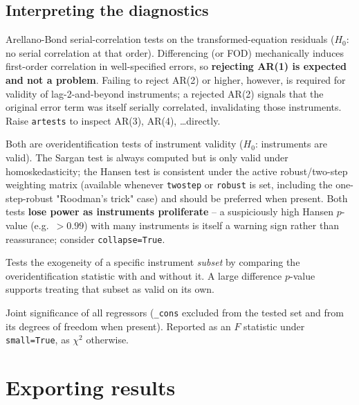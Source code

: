 \documentclass[11pt,a4paper]{article}
\begin{document}
\subsection{Interpreting the diagnostics}
\label{sec:diagdiag}

\begin{description}[nosep]
  \item[AR(1)/AR(2)] Arellano-Bond serial-correlation tests on the
    transformed-equation residuals ($H_0$: no serial correlation at that
    order). Differencing (or FOD) mechanically induces first-order
    correlation in well-specified errors, so \textbf{rejecting AR(1) is
    expected and not a problem}. Failing to reject AR(2) or higher, however,
    is required for validity of lag-2-and-beyond instruments; a rejected
    AR(2) signals that the original error term was itself serially
    correlated, invalidating those instruments. Raise \texttt{artests} to
    inspect AR(3), AR(4), \dots directly.
  \item[Sargan vs.\ Hansen] Both are overidentification tests of instrument
    validity ($H_0$: instruments are valid). The Sargan test is always
    computed but is only valid under homoskedasticity; the Hansen test is
    consistent under the active robust/two-step weighting matrix (available
    whenever \texttt{twostep} or \texttt{robust} is set, including the
    one-step-robust "Roodman's trick" case) and should be preferred when
    present. Both tests \textbf{lose power as instruments proliferate}
    \citep{Roodman2009b} -- a suspiciously high Hansen $p$-value (e.g.\
    $>0.99$) with many instruments is itself a warning sign rather than
    reassurance; consider \texttt{collapse=True}.
  \item[Difference-in-Sargan/Hansen] Tests the exogeneity of a specific
    instrument \emph{subset} by comparing the overidentification statistic
    with and without it. A large difference $p$-value supports treating that
    subset as valid on its own.
  \item[Wald / $F$ test] Joint significance of all regressors
    (\texttt{\_cons} excluded from the tested set and from its degrees of
    freedom when present). Reported as an $F$ statistic under
    \texttt{small=True}, as $\chi^2$ otherwise.
\end{description}

\section{Exporting results}
\label{sec:export}
\end{document}
